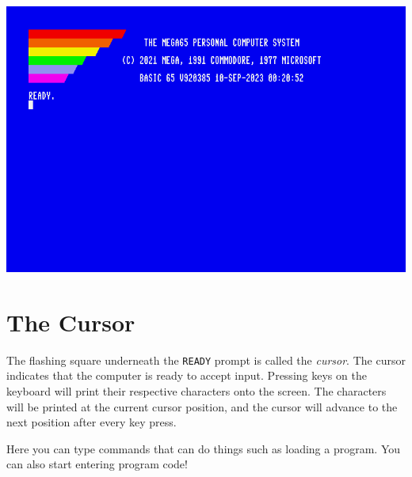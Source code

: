 \begin{center}
  \includegraphics[width=0.7\linewidth]{images/img011_final_boot_06.png}
\end{center}

\section{The Cursor}

The flashing square underneath the \texttt{READY} prompt is called the \emph{cursor}. The cursor indicates that the computer is ready to accept input. Pressing keys on the keyboard will print their respective characters onto the screen. The characters will be printed at the current cursor position, and the cursor will advance to the next position after every key press.

Here you can type commands that can do things such as loading a program. You can also start entering program code!
